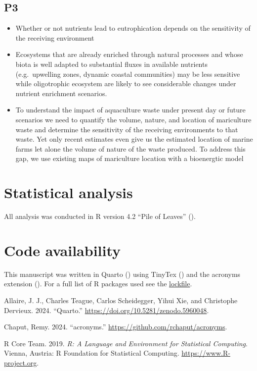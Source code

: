 \documentclass[
  a4paper,
]{article}
\providecommand{\tightlist}{%
  \setlength{\itemsep}{0pt}\setlength{\parskip}{0pt}}\usepackage{longtable,booktabs,array}
\newlength{\cslhangindent}
\newenvironment{CSLReferences}[2] %
 {\begin{list}{}{%
  \setlength{\itemindent}{0pt}
  \setlength{\leftmargin}{0pt}
  \setlength{\parsep}{0pt}
  \ifodd #1
   \setlength{\leftmargin}{\cslhangindent}
   \setlength{\itemindent}{-1\cslhangindent}
  \fi
  \setlength{\itemsep}{#2\baselineskip}}}
 {\end{list}}
\begin{document}
\subsection{P3}\label{p3}

\begin{itemize}
\tightlist
\item
  Whether or not nutrients lead to eutrophication depends on the
  sensitivity of the receiving environment
\item
  Ecosystems that are already enriched through natural processes and
  whose biota is well adapted to substantial fluxes in available
  nutrients (e.g.~upwelling zones, dynamic coastal communities) may be
  less sensitive while oligotrophic ecosystem are likely to see
  considerable changes under nutrient enrichment scenarios.
\item
  To understand the impact of aquaculture waste under present day or
  future scenarios we need to quantify the volume, nature, and location
  of mariculture waste and determine the sensitivity of the receiving
  environments to that waste. Yet only recent estimates even give us the
  estimated location of marine farms let alone the volume of nature of
  the waste produced. To address this gap, we use existing maps of
  mariculture location with a bioenergtic model
\end{itemize}

\section{Statistical analysis}\label{statistical-analysis}

All analysis was conducted in R version 4.2 ``Pile of Leaves''
().

\section{Code availability}\label{code-availability}

This manuscript was written in Quarto () using TinyTex () and
the acronyms extension (). For a
full list of R packages used see the
\href{https://www.github.com}{lockfile}.

\label{refs}
\begin{CSLReferences}{1}{0}
Allaire, J. J., Charles Teague, Carlos Scheidegger, Yihui Xie, and
Christophe Dervieux. 2024. {``{Quarto}.''}
\url{https://doi.org/10.5281/zenodo.5960048}.

Chaput, Remy. 2024. {``{acronyms}.''}
\url{https://github.com/rchaput/acronyms}.

R Core Team. 2019. \emph{R: A Language and Environment for Statistical
Computing}. Vienna, Austria: R Foundation for Statistical Computing.
\url{https://www.R-project.org}.

\end{CSLReferences}
\end{document}
